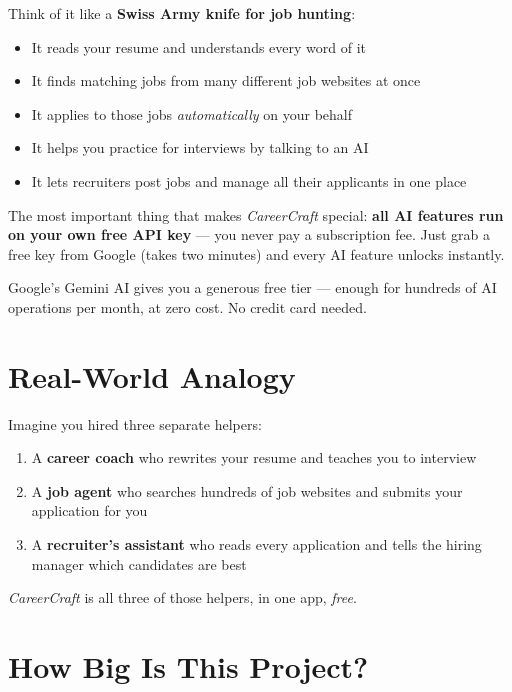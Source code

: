 \documentclass[12pt, a4paper]{report}
\newcommand{\cc}{\textit{CareerCraft}}
\begin{document}
Think of it like a \textbf{Swiss Army knife for job hunting}:
\begin{itemize}
  \item It reads your resume and understands every word of it
  \item It finds matching jobs from many different job websites at once
  \item It applies to those jobs \emph{automatically} on your behalf
  \item It helps you practice for interviews by talking to an AI
  \item It lets recruiters post jobs and manage all their applicants in one place
\end{itemize}

The most important thing that makes \cc{} special: \textbf{all AI features run on
your own free API key} --- you never pay a subscription fee.  Just grab a free key
from Google (takes two minutes) and every AI feature unlocks instantly.

\begin{tipbox}
Google's Gemini AI gives you a generous free tier --- enough for hundreds of AI
operations per month, at zero cost.  No credit card needed.
\end{tipbox}

\section{Real-World Analogy}

Imagine you hired three separate helpers:

\begin{enumerate}
  \item A \textbf{career coach} who rewrites your resume and teaches you to interview
  \item A \textbf{job agent} who searches hundreds of job websites and submits your
        application for you
  \item A \textbf{recruiter's assistant} who reads every application and tells the
        hiring manager which candidates are best
\end{enumerate}

\cc{} is all three of those helpers, in one app, \emph{free}.

\section{How Big Is This Project?}
\end{document}
